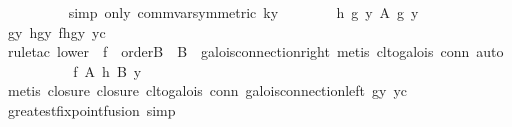 \begin{isabellebody}
\ \ \ \ \ \ \ \ \isamarkupfalse%
\ {}simp\ only{}\ comm{}var{}symmetric{}\ ky{}\isanewline
\ \ \ \ \ \ \isamarkupfalse%
\ {}h\ {}g\ y{}\ {}\isactrlbsub A\isactrlesub \ g\ y{}\ \isamarkupfalse%
\ gy\ hgy\ fhgy\ yc\isanewline
\ \ \ \ \ \ \ \ \isamarkupfalse%
\ {}rule{}tac\ lower\ {}\ f\ \ orderB\ {}\ B\ \ galois{}connection{}right{}\ metis\ cl{}to{}galois\ conn{}\ auto{}{}\isanewline
\ \ \ \ \isamarkupfalse%
\isanewline
\ \ \ \ \isamarkupfalse%
\ {}f\ {}{}\isactrlbsub A\isactrlesub \ h{}\ {}\isactrlbsub B\isactrlesub \ y{}\isanewline
\ \ \ \ \ \ \isamarkupfalse%
\ {}metis\ closure{}\ closure{}\ cl{}to{}galois\ conn\ galois{}connection{}left\ gy\ yc{}\isanewline
\ \ \isamarkupfalse%
\isanewline
{}\isamarkupfalse%
%
\endisatagproof
{\isafoldproof}%
%
\isadelimproof
\isanewline
%
\endisadelimproof
\isanewline
{}\isamarkupfalse%
\ greatest{}fixpoint{}fusion\ {}simp{}{}\isanewline

\end{isabellebody}
